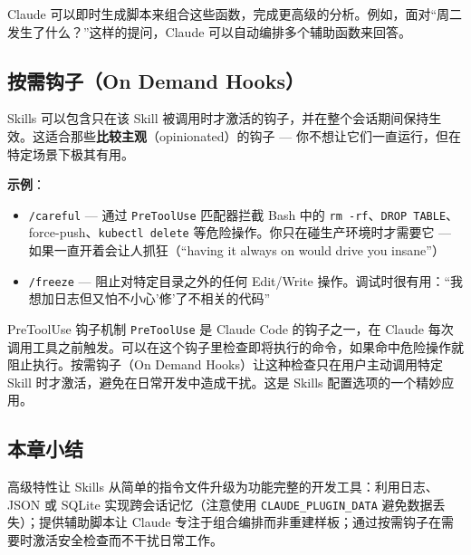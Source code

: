 Claude 可以即时生成脚本来组合这些函数，完成更高级的分析。例如，面对``周二发生了什么？''这样的提问，Claude 可以自动编排多个辅助函数来回答。

\subsection{按需钩子（On Demand Hooks）}

Skills 可以包含只在该 Skill 被调用时才激活的钩子，并在整个会话期间保持生效。这适合那些\textbf{比较主观}（opinionated）的钩子 --- 你不想让它们一直运行，但在特定场景下极其有用。

\textbf{示例}：
\begin{itemize}
    \item \texttt{/careful} --- 通过 \texttt{PreToolUse} 匹配器拦截 Bash 中的 \texttt{rm -rf}、\texttt{DROP TABLE}、force-push、\texttt{kubectl delete} 等危险操作。你只在碰生产环境时才需要它 --- 如果一直开着会让人抓狂（``having it always on would drive you insane''）
    \item \texttt{/freeze} --- 阻止对特定目录之外的任何 Edit/Write 操作。调试时很有用：``我想加日志但又怕不小心'修'了不相关的代码''
\end{itemize}

\begin{knowledgebox}{PreToolUse 钩子机制}
\texttt{PreToolUse} 是 Claude Code 的钩子之一，在 Claude 每次调用工具之前触发。可以在这个钩子里检查即将执行的命令，如果命中危险操作就阻止执行。按需钩子（On Demand Hooks）让这种检查只在用户主动调用特定 Skill 时才激活，避免在日常开发中造成干扰。这是 Skills 配置选项的一个精妙应用。
\end{knowledgebox}

\subsection{本章小结}

高级特性让 Skills 从简单的指令文件升级为功能完整的开发工具：利用日志、JSON 或 SQLite 实现跨会话记忆（注意使用 \texttt{CLAUDE\_PLUGIN\_DATA} 避免数据丢失）；提供辅助脚本让 Claude 专注于组合编排而非重建样板；通过按需钩子在需要时激活安全检查而不干扰日常工作。

